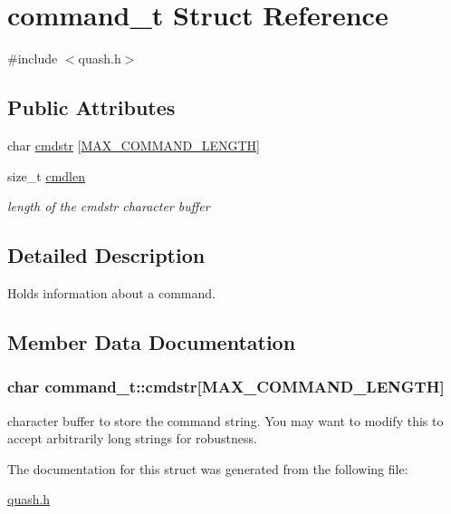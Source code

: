 \hypertarget{structcommand__t}{\section{command\-\_\-t Struct Reference}
\label{structcommand__t}
}


{\ttfamily \#include $<$quash.\-h$>$}

\subsection*{Public Attributes}
\begin{DoxyCompactItemize}
\item 
char \hyperlink{structcommand__t_a3b77457907f6e606ffafb2f1c2dbfa49}{cmdstr} \mbox{[}\hyperlink{quash_8h_af1abcb51a4aa27a5a5a7958c03448134}{M\-A\-X\-\_\-\-C\-O\-M\-M\-A\-N\-D\-\_\-\-L\-E\-N\-G\-T\-H}\mbox{]}
\item 
\hypertarget{structcommand__t_a6728ce7c3f0c69523ac3d4c74477f8d2}{size\-\_\-t \hyperlink{structcommand__t_a6728ce7c3f0c69523ac3d4c74477f8d2}{cmdlen}}\label{structcommand__t_a6728ce7c3f0c69523ac3d4c74477f8d2}

\begin{DoxyCompactList}\small\item\em length of the cmdstr character buffer \end{DoxyCompactList}\end{DoxyCompactItemize}


\subsection{Detailed Description}
Holds information about a command. 

\subsection{Member Data Documentation}
\hypertarget{structcommand__t_a3b77457907f6e606ffafb2f1c2dbfa49}{
\subsubsection[{cmdstr}]{\setlength{\rightskip}{0pt plus 5cm}char command\-\_\-t\-::cmdstr\mbox{[}{\bf M\-A\-X\-\_\-\-C\-O\-M\-M\-A\-N\-D\-\_\-\-L\-E\-N\-G\-T\-H}\mbox{]}}}\label{structcommand__t_a3b77457907f6e606ffafb2f1c2dbfa49}
character buffer to store the command string. You may want to modify this to accept arbitrarily long strings for robustness. 

The documentation for this struct was generated from the following file\-:\begin{DoxyCompactItemize}
\item 
\hyperlink{quash_8h}{quash.\-h}\end{DoxyCompactItemize}
